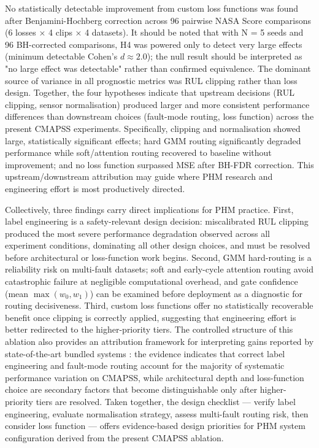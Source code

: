 \documentclass[review,12pt]{elsarticle}
\begin{document}
No statistically detectable improvement from custom loss functions was found after Benjamini-Hochberg correction across 96 pairwise NASA Score comparisons (6 losses × 4 clips × 4 datasets). It should be noted that with N = 5 seeds and 96 BH-corrected comparisons, H4 was powered only to detect very large effects (minimum detectable Cohen's $d \approx 2.0$); the null result should be interpreted as "no large effect was detectable" rather than confirmed equivalence. The dominant source of variance in all prognostic metrics was RUL clipping rather than loss design. Together, the four hypotheses indicate that upstream decisions (RUL clipping, sensor normalisation) produced larger and more consistent performance differences than downstream choices (fault-mode routing, loss function) across the present CMAPSS experiments. Specifically, clipping and normalisation showed large, statistically significant effects; hard GMM routing significantly degraded performance while soft/attention routing recovered to baseline without improvement; and no loss function surpassed MSE after BH-FDR correction. This upstream/downstream attribution may guide where PHM research and engineering effort is most productively directed.

Collectively, three findings carry direct implications for PHM practice. First, label engineering is a safety-relevant design decision: miscalibrated RUL clipping produced the most severe performance degradation observed across all experiment conditions, dominating all other design choices, and must be resolved before architectural or loss-function work begins. Second, GMM hard-routing is a reliability risk on multi-fault datasets; soft and early-cycle attention routing avoid catastrophic failure at negligible computational overhead, and gate confidence (mean $\max(w_0, w_1)$) can be examined before deployment as a diagnostic for routing decisiveness. Third, custom loss functions offer no statistically recoverable benefit once clipping is correctly applied, suggesting that engineering effort is better redirected to the higher-priority tiers. The controlled structure of this ablation also provides an attribution framework for interpreting gains reported by state-of-the-art bundled systems \cite{ref14,ref29,ref42}: the evidence indicates that correct label engineering and fault-mode routing account for the majority of systematic performance variation on CMAPSS, while architectural depth and loss-function choice are secondary factors that become distinguishable only after higher-priority tiers are resolved. Taken together, the design checklist — verify label engineering, evaluate normalisation strategy, assess multi-fault routing risk, then consider loss function — offers evidence-based design priorities for PHM system configuration derived from the present CMAPSS ablation.
\end{document}
